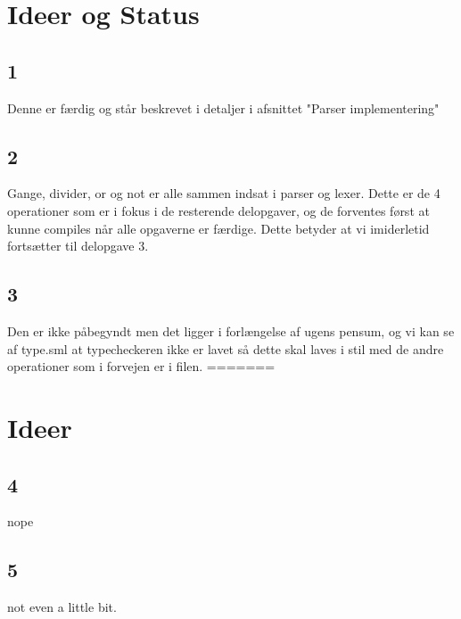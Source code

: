 \documentclass[11pt,a4paper]{article}
\begin{document}
\section*{Ideer og Status}

\subsection{1}
Denne er færdig og står beskrevet i detaljer i afsnittet "Parser implementering"

\subsection{2}
Gange, divider, or og not er alle sammen indsat i parser og lexer. Dette er de 4 operationer som er i fokus i de resterende delopgaver, og de forventes først at kunne compiles når alle opgaverne er færdige.
Dette betyder at vi imiderletid fortsætter til delopgave 3.

\subsection{3}
Den er ikke påbegyndt men det ligger i forlængelse af ugens pensum, og vi kan se af type.sml at typecheckeren ikke er lavet så dette skal laves i stil med de andre operationer som i forvejen er i filen.
=======
\section*{Ideer}

\subsection{4}
nope
\subsection{5}
not even a little bit.
\end{document}
